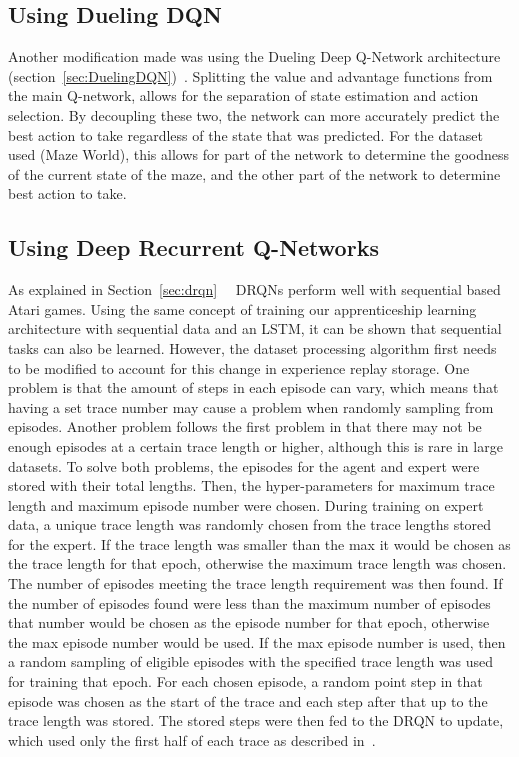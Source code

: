\documentclass[12pt,american]{report}
\begin{document}
\subsection{Using Dueling DQN}
Another modification made was using the Dueling Deep Q-Network architecture (section~\ref{sec:DuelingDQN})~\cite{wang2015dueling}.  Splitting the value and advantage functions from the main Q-network, allows for the separation of state estimation and action selection.  By decoupling these two, the network can more accurately predict the best action to take regardless of the state that was predicted. For the dataset used (Maze World), this allows for part of the network to determine the goodness of the current state of the maze, and the other part of the network to determine best action to take. 

\subsection{Using Deep Recurrent Q-Networks}
\label{sec:drqn-implementation}
As explained in Section~\ref{sec:drqn}~\cite{HausknechtDRQN}~\cite{DBLP:journals/corr/LampleC16} DRQNs perform well with sequential based Atari games. Using the same concept of training our apprenticeship learning architecture with sequential data and an LSTM, it can be shown that sequential tasks can also be learned.  However, the dataset processing algorithm first needs to be modified to account for this change in experience replay storage.  One problem is that the amount of steps in each episode can vary, which means that having a set trace number may cause a problem when randomly sampling from episodes.  Another problem follows the first problem in that there may not be enough episodes at a certain trace length or higher, although this is rare in large datasets.  To solve both problems, the episodes for the agent and expert were stored with their total lengths.  Then, the hyper-parameters for maximum trace length and maximum episode number were chosen.  During training on expert data, a unique trace length was randomly chosen from the trace lengths stored for the expert.  If the trace length was smaller than the max it would be chosen as the trace length for that epoch, otherwise the maximum trace length was chosen.  The number of episodes meeting the trace length requirement was then found.  If the number of episodes found were less than the maximum number of episodes that number would be chosen as the episode number for that epoch, otherwise the max episode number would be used.  If the max episode number is used, then a random sampling of eligible episodes with the specified trace length was used for training that epoch.  For each chosen episode, a random point step in that episode was chosen as the start of the trace and each step after that up to the trace length was stored.  The stored steps were then fed to the DRQN to update, which used only the first half of each trace as described in~\cite{DBLP:journals/corr/LampleC16}.
\end{document}
